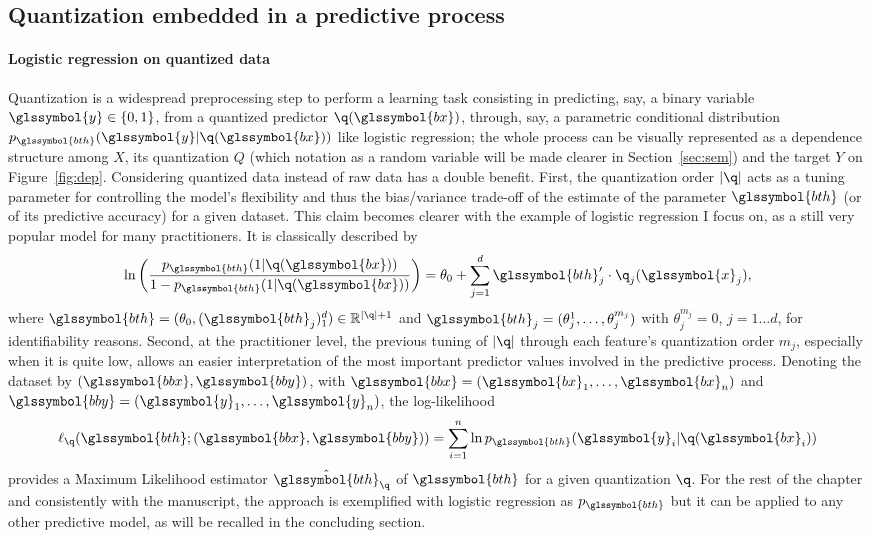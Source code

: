 \subsection{Quantization embedded in a predictive process}

\paragraph{Logistic regression on quantized data}

Quantization is a widespread preprocessing step to perform a learning task consisting in predicting, say, a binary variable $\glssymbol{y}\in\{0,1\}$, from a quantized predictor  $\q(\glssymbol{bx})$, through, say, a parametric conditional distribution $p_{\glssymbol{bth}}(\glssymbol{y}|\q(\glssymbol{bx}))$ like logistic regression; the whole process can be visually represented as a dependence structure among $X$, its quantization $Q$ (which notation as a random variable will be made clearer in Section~\ref{sec:sem}) and the target $Y$ on Figure~\ref{fig:dep}. Considering quantized data instead of raw data has a double benefit. First, the quantization order $|\q|$ acts as a tuning parameter for controlling the model's flexibility and thus the bias/variance trade-off of the estimate of the parameter $\glssymbol{bth}$ (or of its predictive accuracy) for a given dataset. This claim becomes clearer with the example of logistic regression I focus on, as a still very popular model for many practitioners. It is classically described by
\begin{equation}
    \label{eq:reglogq}
\ln \left( \dfrac{p_{\glssymbol{bth}}(1|\q(\glssymbol{bx}))}{1 - p_{\glssymbol{bth}}(1|\q(\glssymbol{bx}))} \right) = \theta_0 + \sum_{j=1}^d \glssymbol{bth}_j' \cdot \q_j(\glssymbol{x}_j),
\end{equation}
where $\glssymbol{bth} = (\theta_{0},(\glssymbol{bth}_j)_1^d) \in \mathbb{R}^{|\q|+1}$ and $\glssymbol{bth}_j = (\theta_{j}^{1},\dots,\theta_{j}^{m_j})$ with $\theta_{j}^{m_j} = 0$, $j=1 \ldots d$, for identifiability reasons.
Second, at the practitioner level, the previous tuning of $|\q|$ through each feature's quantization order $m_j$, especially when it is quite low, allows an easier interpretation of the most important predictor values involved in the predictive process. Denoting the dataset by $(\glssymbol{bbx},\glssymbol{bby})$, with $\glssymbol{bbx}=(\glssymbol{bx}_1,\ldots,\glssymbol{bx}_n)$ and $\glssymbol{bby}=(\glssymbol{y}_1,\ldots,\glssymbol{y}_n)$, the log-likelihood 
\begin{equation}
\label{eq:lq}
\ell_{\q}(\glssymbol{bth} ; (\glssymbol{bbx},\glssymbol{bby}))=\sum_{i=1}^n \ln p_{\glssymbol{bth}}(\glssymbol{y}_i|\q(\glssymbol{bx}_i))
\end{equation}
provides a Maximum Likelihood estimator $\hat{\glssymbol{bth}}_\q$ of $\glssymbol{bth}$ for a given quantization $\q$. For the rest of the chapter and consistently with the manuscript, the approach is exemplified with logistic regression as $p_{\glssymbol{bth}}$ but it can be applied to any other predictive model, as will be recalled in the concluding section.


